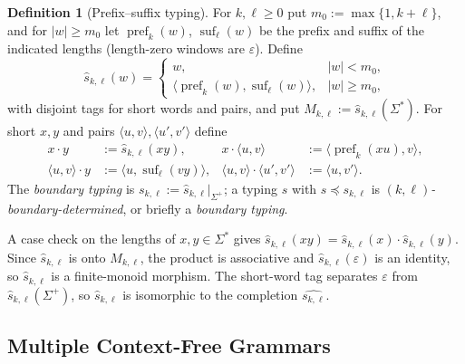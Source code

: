 \documentclass[11pt]{article}
\numberwithin{equation}{section}
\theoremstyle{plain}
\theoremstyle{definition}
\newtheorem{definition}[theorem]{Definition}
\theoremstyle{remark}
\newcommand{\eps}{\varepsilon}
\begin{document}
\begin{definition}[Prefix--suffix typing]
\label{def:prefix-suffix-typing}
For $k,\ell\ge0$ put $m_0:=\max\{1,k+\ell\}$, and for $|w|\ge m_0$ let
$\operatorname{pref}_k(w)$, $\operatorname{suf}_\ell(w)$ be the prefix and
suffix of the indicated lengths (length-zero windows are $\eps$).  Define
\[
 \widehat{s}_{k,\ell}(w)=
 \begin{cases}
   w, & |w|<m_0,\\
   \langle\operatorname{pref}_k(w),\operatorname{suf}_\ell(w)\rangle,
      & |w|\ge m_0,
 \end{cases}
\]
with disjoint tags for short words and pairs, and put
$M_{k,\ell}:=\widehat{s}_{k,\ell}(\Sigma^*)$.  For short $x,y$ and pairs
$\langle u,v\rangle,\langle u',v'\rangle$ define
\[
\begin{aligned}
 x\cdot y&:=\widehat{s}_{k,\ell}(xy), &
 x\cdot\langle u,v\rangle&:=\langle\operatorname{pref}_k(xu),v\rangle,\\
 \langle u,v\rangle\cdot y&:=\langle u,\operatorname{suf}_\ell(vy)\rangle, &
 \langle u,v\rangle\cdot\langle u',v'\rangle&:=\langle u,v'\rangle.
\end{aligned}
\]
The \emph{boundary typing} is $s_{k,\ell}:=\widehat{s}_{k,\ell}|_{\Sigma^+}$; a
typing $s$ with $s\preceq s_{k,\ell}$ is \emph{$(k,\ell)$-boundary-determined},
or briefly a \emph{boundary typing}.
\end{definition}

A case check on the lengths of $x,y\in\Sigma^*$ gives
$\widehat{s}_{k,\ell}(xy)=\widehat{s}_{k,\ell}(x)\cdot\widehat{s}_{k,\ell}(y)$.
Since $\widehat{s}_{k,\ell}$ is onto $M_{k,\ell}$, the product is associative
and $\widehat{s}_{k,\ell}(\eps)$ is an identity, so $\widehat{s}_{k,\ell}$ is a
finite-monoid morphism.  The short-word tag separates $\eps$ from
$\widehat{s}_{k,\ell}(\Sigma^+)$, so $\widehat{s}_{k,\ell}$ is isomorphic to the
completion $\widehat{s_{k,\ell}}$.

\subsection{Multiple Context-Free Grammars}
\end{document}
